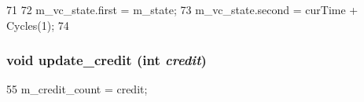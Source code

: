 \begin{DoxyCode}
71     {
72         m_vc_state.first = m_state;
73         m_vc_state.second = curTime + Cycles(1);
74     }
\end{DoxyCode}
\hypertarget{classVirtualChannel__d_a158140800f6b905b9e00fe78ad2697f0}{
\subsubsection[{update\_\-credit}]{\setlength{\rightskip}{0pt plus 5cm}void update\_\-credit (int {\em credit})}}
\label{classVirtualChannel__d_a158140800f6b905b9e00fe78ad2697f0}



\begin{DoxyCode}
55 { m_credit_count = credit; }
\end{DoxyCode}


